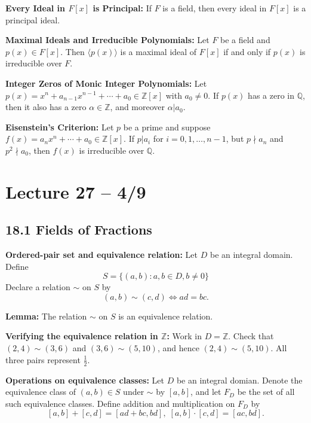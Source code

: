 \documentclass{article}
\newcommand{\Z}{\mathbb{Z}}
\newcommand{\Q}{\mathbb{Q}}
\begin{document}
\begin{theorem}
  \textbf{Every Ideal in $F[x]$ is Principal:} If $F$ is a field, then every ideal in $F[x]$ is a principal ideal.
\end{theorem}
\begin{theorem}
  \textbf{Maximal Ideals and Irreducible Polynomials:} Let $F$ be a field and $p(x)\in F[x]$. Then $\langle p(x)\rangle$ is a maximal ideal of $F[x]$ if and only if $p(x)$ is irreducible over $F$.
\end{theorem}
\begin{theorem}
  \textbf{Integer Zeros of Monic Integer Polynomials:} Let $p(x)=x^n+a_{n-1}x^{n-1}+\cdots+a_0\in\Z[x]$ with $a_0\neq0$. If $p(x)$ has a zero in $\Q$, then it also has a zero $\alpha\in\Z$, and moreover $\alpha|a_0$.
\end{theorem}

\begin{theorem}
  \textbf{Eisenstein's Criterion:} Let $p$ be a prime and suppose $f(x)=a_nx^n+\cdots+a_0\in\Z[x]$. If $p|a_i$ for $i=0,1,\dots,n-1$, but $p\nmid a_n$ and $p^2\nmid a_0$, then $f(x)$ is irreducible over $\Q$.
\end{theorem}
\section{Lecture 27 -- 4/9}
\subsection{18.1 Fields of Fractions}
\textbf{Ordered-pair set and equivalence relation:} Let $D$ be an integral domain. Define \[S=\{(a,b):a,b\in D,b\neq0\}\] Declare a relation $\sim$ on $S$ by \[(a,b)\sim(c,d)\iff ad=bc.\]

\textbf{Lemma:}  The relation $\sim$ on $S$ is an equivalence relation.

\begin{example}
  \textbf{Verifying the equivalence relation in $\Z$:} Work in $D=\Z$. Check that $(2,4)\sim(3,6)$ and $(3,6)\sim(5,10)$, and hence $(2,4)\sim(5,10)$. All three pairs represent $\frac{1}{2}$.
\end{example}

\textbf{Operations on equivalence classes:} Let $D$ be an integral domian. Denote the equivalence class of $(a,b)\in S$ under $\sim$ by $[a,b]$, and let $F_D$ be the set of all such equivalence classes. Define addition and multiplication on $F_D$ by \[[a,b]+[c,d]=[ad+bc,bd],\;[a,b]\cdot[c,d]=[ac,bd].\]
\end{document}
